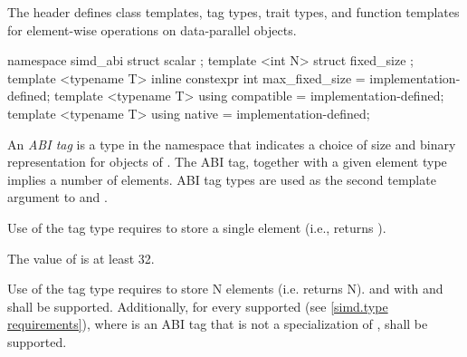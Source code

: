

\pnum
The header  defines class templates, tag types, trait types, and function templates for element-wise operations on data-parallel objects.


\begin{itemdecl}
namespace simd_abi {
  struct scalar {};
  template <int N> struct fixed_size {};
  template <typename T> inline constexpr int max_fixed_size = implementation-defined;
  template <typename T> using compatible = implementation-defined;
  template <typename T> using native = implementation-defined;
}
\end{itemdecl}
\begin{itemdescr}
  \pnum
  An \emph{ABI tag} is a type in the  namespace that indicates a choice of size and binary representation for objects of \dataparalleltype.
  The ABI tag, together with a given element type implies a number of elements.
  ABI tag types are used as the second template argument to \simd and \mask.

  \pnum
  Use of the  tag type requires \dataparalleltypes to store a single element (i.e., \simd{} returns ).

  \pnum\label{simd.maxfixedsize.def}%
  The value of  is at least 32.

  \pnum\label{simd.fixedsize.def}%
  Use of the \fixedsizeN tag type requires \dataparalleltypes to store \code N elements (i.e. \simd{} returns \code N).
   and  with  and  shall be supported.
  Additionally, for every supported \simd[<T, Abi>] (see \ref{simd.type requirements}), where  is an ABI tag that is not a specialization of ,  shall be supported.


\end{itemdescr}
